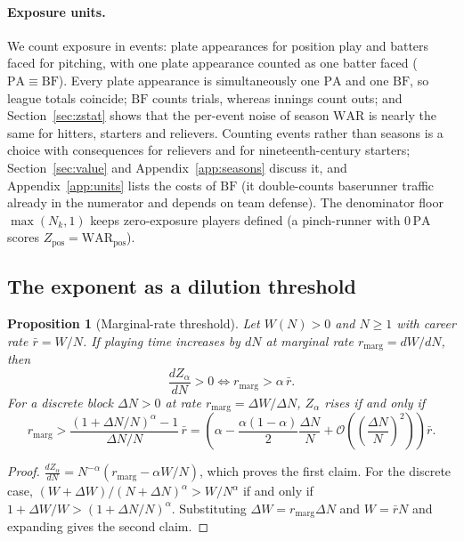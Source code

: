 \documentclass[11pt,letterpaper]{article}
\theoremstyle{plain}
\newtheorem{proposition}{Proposition}
\theoremstyle{definition}
\theoremstyle{remark}
\newcommand{\WAR}{\mathrm{WAR}}
\newcommand{\PA}{\mathrm{PA}}
\newcommand{\BF}{\mathrm{BF}}
\newcommand{\Zpos}{Z_{\mathrm{pos}}}
\begin{document}
\paragraph{Exposure units.} We count exposure in events: plate appearances for position play and batters faced for pitching, with one plate appearance counted as one batter faced ($\PA \equiv \BF$). Every plate appearance is simultaneously one $\PA$ and one $\BF$, so league totals coincide; $\BF$ counts trials, whereas innings count outs; and Section~\ref{sec:zstat} shows that the per-event noise of season $\WAR$ is nearly the same for hitters, starters and relievers. Counting events rather than seasons is a choice with consequences for relievers and for nineteenth-century starters; Section~\ref{sec:value} and Appendix~\ref{app:seasons} discuss it, and Appendix~\ref{app:units} lists the costs of $\BF$ (it double-counts baserunner traffic already in the numerator and depends on team defense). The denominator floor $\max(N_k, 1)$ keeps zero-exposure players defined (a pinch-runner with $0\,\PA$ scores $\Zpos = \WAR_{\mathrm{pos}}$).

\subsection{The exponent as a dilution threshold}
\label{sec:alpha}

\begin{proposition}[Marginal-rate threshold]
\label{prop:alpha}
Let $W(N) > 0$ and $N \ge 1$ with career rate $\bar r = W/N$. If playing time increases by $dN$ at marginal rate $r_{\mathrm{marg}} = dW/dN$, then
\begin{equation}
    \frac{dZ_\alpha}{dN} > 0 \iff r_{\mathrm{marg}} > \alpha\,\bar r .
\end{equation}
For a discrete block $\Delta N > 0$ at rate $r_{\mathrm{marg}} = \Delta W/\Delta N$, $Z_\alpha$ rises if and only if
\begin{equation}
    r_{\mathrm{marg}} > \frac{(1+\Delta N/N)^{\alpha} - 1}{\Delta N/N}\,\bar r
    = \left(\alpha - \frac{\alpha(1-\alpha)}{2}\frac{\Delta N}{N} + \mathcal{O}\!\left(\left(\frac{\Delta N}{N}\right)^{\!2}\right)\right)\bar r .
\end{equation}
\end{proposition}

\begin{proof}
$\frac{dZ_\alpha}{dN} = N^{-\alpha}\left(r_{\mathrm{marg}} - \alpha W/N\right)$, which proves the first claim. For the discrete case, $(W+\Delta W)/(N+\Delta N)^\alpha > W/N^\alpha$ if and only if $1 + \Delta W/W > (1+\Delta N/N)^\alpha$. Substituting $\Delta W = r_{\mathrm{marg}}\Delta N$ and $W = \bar r N$ and expanding gives the second claim.
\end{proof}
\end{document}
